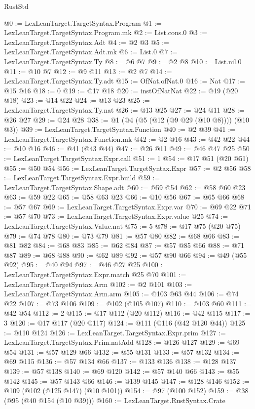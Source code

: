 \begin{lexlean}{RustStd}
\begin{coremodule}
@0 := LexLeanTarget.TargetSyntax.Program
@1 := LexLeanTarget.TargetSyntax.Program.mk
@2 := List.cons.{0}
@3 := LexLeanTarget.TargetSyntax.Adt
@4 := @2 @3
@5 := LexLeanTarget.TargetSyntax.Adt.mk
@6 := List.{0}
@7 := LexLeanTarget.TargetSyntax.Ty
@8 := @6 @7
@9 := @2 @8
@10 := List.nil.{0}
@11 := @10 @7
@12 := @9 @11
@13 := @2 @7
@14 := LexLeanTarget.TargetSyntax.Ty.adt
@15 := OfNat.ofNat.{0}
@16 := Nat
@17 := @15 @16
@18 := 0
@19 := @17 @18
@20 := instOfNatNat
@22 := @19 (@20 @18)
@23 := @14 @22
@24 := @13 @23
@25 := LexLeanTarget.TargetSyntax.Ty.nat
@26 := @13 @25
@27 := @24 @11
@28 := @26 @27
@29 := @24 @28
@38 := @1 (@4 (@5 (@12 (@9 @29 (@10 @8)))) (@10 @3))
@39 := LexLeanTarget.TargetSyntax.Function
@40 := @2 @39
@41 := LexLeanTarget.TargetSyntax.Function.mk
@42 := @2 @16
@43 := @42 @22
@44 := @10 @16
@46 := @41 (@43 @44)
@47 := @26 @11
@49 := @46 @47 @25
@50 := LexLeanTarget.TargetSyntax.Expr.call
@51 := 1
@54 := @17 @51 (@20 @51)
@55 := @50 @54
@56 := LexLeanTarget.TargetSyntax.Expr
@57 := @2 @56
@58 := LexLeanTarget.TargetSyntax.Expr.build
@59 := LexLeanTarget.TargetSyntax.Shape.adt
@60 := @59 @54
@62 := @58 @60 @23
@63 := @59 @22
@65 := @58 @63 @23
@66 := @10 @56
@67 := @65 @66
@68 := @57 @67
@69 := LexLeanTarget.TargetSyntax.Expr.var
@70 := @69 @22
@71 := @57 @70
@73 := LexLeanTarget.TargetSyntax.Expr.value @25
@74 := LexLeanTarget.TargetSyntax.Value.nat
@75 := 5
@78 := @17 @75 (@20 @75)
@79 := @74 @78
@80 := @73 @79
@81 := @57 @80
@82 := @68 @66
@83 := @81 @82
@84 := @68 @83
@85 := @62 @84
@87 := @57 @85 @66
@88 := @71 @87
@89 := @68 @88
@90 := @62 @89
@92 := @57 @90 @66
@94 := @49 (@55 @92)
@95 := @40 @94
@97 := @46 @27 @25
@100 := LexLeanTarget.TargetSyntax.Expr.match @25 @70
@101 := LexLeanTarget.TargetSyntax.Arm
@102 := @2 @101
@103 := LexLeanTarget.TargetSyntax.Arm.arm
@105 := @103 @63 @44
@106 := @74 @22
@107 := @73 @106
@109 := @102 (@105 @107)
@110 := @103 @60
@111 := @42 @54
@112 := 2
@115 := @17 @112 (@20 @112)
@116 := @42 @115
@117 := 3
@120 := @17 @117 (@20 @117)
@124 := @111 (@116 (@42 @120 @44))
@125 := @110 @124
@126 := LexLeanTarget.TargetSyntax.Expr.prim
@127 := LexLeanTarget.TargetSyntax.Prim.natAdd
@128 := @126 @127
@129 := @69 @54
@131 := @57 @129 @66
@132 := @55 @131
@133 := @57 @132
@134 := @69 @115
@136 := @57 @134 @66
@137 := @133 @136
@138 := @128 @137
@139 := @57 @138
@140 := @69 @120
@142 := @57 @140 @66
@143 := @55 @142
@145 := @57 @143 @66
@146 := @139 @145
@147 := @128 @146
@152 := @109 (@102 (@125 @147) (@10 @101))
@154 := @97 (@100 @152)
@159 := @38 (@95 (@40 @154 (@10 @39)))
@160 := LexLeanTarget.RustSyntax.Crate

\end{coremodule}
\end{lexlean}
